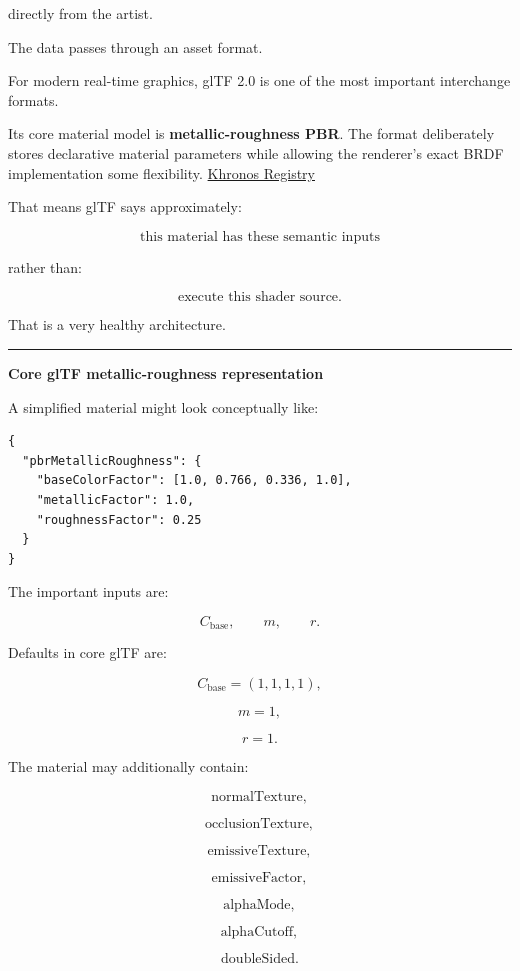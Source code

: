directly from the artist.

The data passes through an asset format.

For modern real-time graphics, glTF 2.0 is one of the most important interchange formats.

Its core material model is \textbf{metallic-roughness PBR}. The format deliberately stores declarative material parameters while allowing the renderer's exact BRDF implementation some flexibility. \href{https://registry.khronos.org/glTF/specs/2.0/glTF-2.0.html?utm_source=chatgpt.com}{Khronos Registry}

That means glTF says approximately:

\[
\text{this material has these semantic inputs}
\]

rather than:

\[
\text{execute this shader source}.
\]

That is a very healthy architecture.

\begin{center}\rule{0.5\linewidth}{0.5pt}\end{center}

\textbf{Core glTF metallic-roughness representation}

A simplified material might look conceptually like:

\begin{verbatim}
{
  "pbrMetallicRoughness": {
    "baseColorFactor": [1.0, 0.766, 0.336, 1.0],
    "metallicFactor": 1.0,
    "roughnessFactor": 0.25
  }
}
\end{verbatim}

The important inputs are:

\[
C_{\text{base}},
\qquad
m,
\qquad
r.
\]

Defaults in core glTF are:

\[
C_{\text{base}}=(1,1,1,1),
\]

\[
m=1,
\]

\[
r=1.
\]

The material may additionally contain:

\[
\text{normalTexture},
\]

\[
\text{occlusionTexture},
\]

\[
\text{emissiveTexture},
\]

\[
\text{emissiveFactor},
\]

\[
\text{alphaMode},
\]

\[
\text{alphaCutoff},
\]

\[
\text{doubleSided}.
\]

